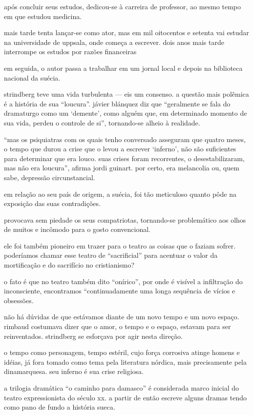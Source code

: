 após concluir seus estudos, dedicou-se à carreira de professor, ao mesmo tempo em que estudou medicina.

mais tarde tenta lançar-se como ator, mas em mil oitocentos e setenta vai estudar na universidade de uppsala, onde começa a escrever. dois anos mais tarde interrompe os estudos por razões financeiras

em seguida, o autor passa a trabalhar em um jornal local e depois na biblioteca nacional da suécia.

strindberg teve uma vida turbulenta — eis um consenso. a questão mais polêmica é a história de sua “loucura”. jávier blánquez diz que “geralmente se fala do dramaturgo como um ‘demente’, como alguém que, em determinado momento de sua vida, perdeu o controle de si”, tornando-se alheio à realidade. 

“mas os psiquiatras com os quais tenho conversado asseguram que quatro meses, o tempo que durou a crise que o levou a escrever ‘inferno’, não são suficientes para determinar que era louco. suas crises foram recorrentes, o desestabilizaram, mas não era loucura”, afirma jordi guinart. por certo, era melancolia ou, quem sabe, depressão circunstancial.

em relação ao seu país de origem, a suécia, foi tão meticuloso quanto pôde na exposição das suas contradições.

provocava sem piedade os seus compatriotas, tornando-se problemático aos olhos de muitos e incômodo para o gosto convencional.

ele foi também pioneiro em trazer para o teatro as coisas que o faziam sofrer. poderíamos chamar esse teatro de “sacrificial” para acentuar o valor da mortificação e do sacrifício no cristianismo? 

o fato é que no teatro também dito “onírico”, por onde é visível a infiltração do inconsciente, encontramos “continuadamente uma longa sequência de vícios e obsessões. 

não há dúvidas de que estávamos diante de um novo tempo e um novo espaço. rimbaud costumava dizer que o amor, o tempo e o espaço, estavam para ser reinventados. strindberg se esforçava por agir nesta direção. 

o tempo como personagem, tempo estéril, cujo força corrosiva atinge homens e idéias, já fora tomado como tema pela literatura nórdica, mais precisamente pela dinamarquesa. seu inferno é sua crise religiosa. 

a trilogia dramática “o caminho para damasco” é considerada marco inicial do teatro expressionista do século xx. a partir de então escreve alguns dramas tendo como pano de fundo a história sueca.

